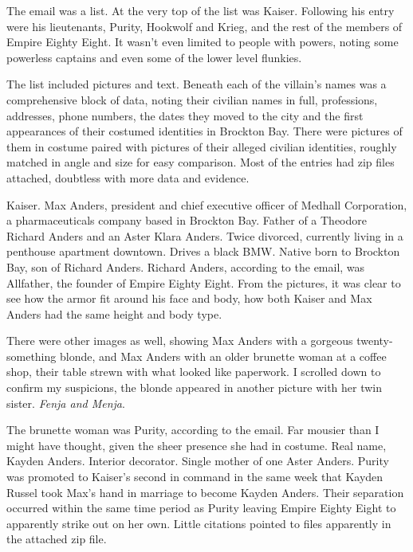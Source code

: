 The email was a list.  At the very top of the list was Kaiser.  Following his entry were his lieutenants, Purity, Hookwolf and Krieg, and the rest of the members of Empire Eighty Eight.  It wasn't even limited to people with powers, noting some powerless captains and even some of the lower level flunkies.



The list included pictures and text.  Beneath each of the villain's names was a comprehensive block of data, noting their civilian names in full, professions, addresses, phone numbers, the dates they moved to the city and the first appearances of their costumed identities in Brockton Bay.  There were pictures of them in costume paired with pictures of their alleged civilian identities, roughly matched in angle and size for easy comparison.  Most of the entries had zip files attached, doubtless with more data and evidence.



Kaiser.  Max Anders, president and chief executive officer of Medhall Corporation, a pharmaceuticals company based in Brockton Bay.  Father of a Theodore Richard Anders and an Aster Klara Anders.  Twice divorced, currently living in a penthouse apartment downtown.  Drives a black BMW.  Native born to Brockton Bay, son of Richard Anders.  Richard Anders, according to the email, was Allfather, the founder of Empire Eighty Eight.  From the pictures, it was clear to see how the armor fit around his face and body, how both Kaiser and Max Anders had the same height and body type.



There were other images as well, showing Max Anders with a gorgeous twenty-something blonde, and Max Anders with an older brunette woman at a coffee shop, their table strewn with what looked like paperwork.  I scrolled down to confirm my suspicions, the blonde appeared in another picture with her twin sister.  \emph{Fenja and Menja}.



The brunette woman was Purity, according to the email.  Far mousier than I might have thought, given the sheer presence she had in costume.  Real name, Kayden Anders.  Interior decorator.  Single mother of one Aster Anders.  Purity was promoted to Kaiser's second in command in the same week that Kayden Russel took Max's hand in marriage to become Kayden Anders.  Their separation occurred within the same time period as Purity leaving Empire Eighty Eight to apparently strike out on her own.  Little citations pointed to files apparently in the attached zip file.



